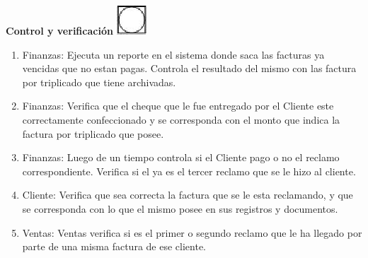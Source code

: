 \begin{center}
  \textbf{Control y verificación}
  \includegraphics{../../../Images/Simbolos/simbolo-Control-y-Verificacion.png}
\end{center}
\begin{enumerate}
\item Finanzas: Ejecuta un reporte en el sistema donde saca las facturas ya vencidas que no estan pagas. Controla el resultado del mismo con las factura por triplicado que tiene archivadas.
\item Finanzas: Verifica que el cheque que le fue entregado por el Cliente este correctamente confeccionado y se corresponda con el monto que indica la factura por triplicado que posee.
\item Finanzas: Luego de un tiempo controla si el Cliente pago o no el reclamo correspondiente. Verifica si el ya es el tercer reclamo que se le hizo al cliente.
\item Cliente: Verifica que sea correcta la factura que se le esta reclamando, y que se corresponda con lo que el mismo posee en sus registros y documentos.
\item Ventas: Ventas verifica si es el primer o segundo reclamo que le ha llegado por parte de una misma factura de ese cliente.
\end{enumerate}

